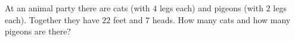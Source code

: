 At an animal party there are cats (with $4$ legs each) and pigeons (with $2$ legs each). Together they have $22$ feet and $7$ heads. How many cats and how many pigeons are there?
